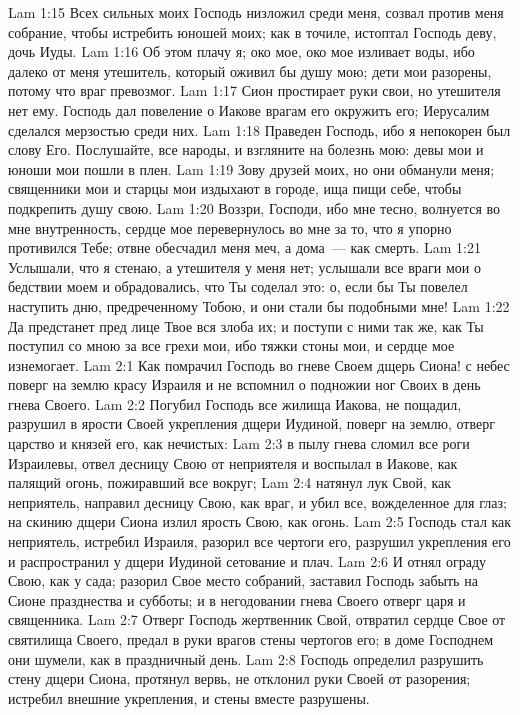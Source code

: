 \vs Lam 1:15 Всех сильных моих Господь низложил среди меня, созвал против меня собрание, чтобы истребить юношей моих; как в точиле, истоптал Господь деву, дочь Иуды.
\vs Lam 1:16 Об этом плачу я; око мое, око мое изливает воды, ибо далеко от меня утешитель, который оживил бы душу мою; дети мои разорены, потому что враг превозмог.
\vs Lam 1:17 Сион простирает руки свои, но утешителя нет ему. Господь дал повеление о Иакове врагам его окружить его; Иерусалим сделался мерзостью среди них.
\vs Lam 1:18 Праведен Господь, ибо я непокорен был слову Его. Послушайте, все народы, и взгляните на болезнь мою: девы мои и юноши мои пошли в плен.
\vs Lam 1:19 Зову друзей моих, но они обманули меня; священники мои и старцы мои издыхают в городе, ища пищи себе, чтобы подкрепить душу свою.
\vs Lam 1:20 Воззри, Господи, ибо мне тесно, волнуется во мне внутренность, сердце мое перевернулось во мне за то, что я упорно противился Тебе; отвне обесчадил меня меч, а дома~--- как смерть.
\vs Lam 1:21 Услышали, что я стенаю, а утешителя у меня нет; услышали все враги мои о бедствии моем и обрадовались, что Ты соделал это: о, если бы Ты повелел наступить дню, предреченному Тобою, и они стали бы подобными мне!
\vs Lam 1:22 Да предстанет пред лице Твое вся злоба их; и поступи с ними так же, как Ты поступил со мною за все грехи мои, ибо тяжки стоны мои, и сердце мое изнемогает.
\vs Lam 2:1 Как помрачил Господь во гневе Своем дщерь Сиона! с небес поверг на землю красу Израиля и не вспомнил о подножии ног Своих в день гнева Своего.
\vs Lam 2:2 Погубил Господь все жилища Иакова, не пощадил, разрушил в ярости Своей укрепления дщери Иудиной, поверг на землю, отверг царство и князей его, как нечистых:
\vs Lam 2:3 в пылу гнева сломил все роги Израилевы, отвел десницу Свою от неприятеля и воспылал в Иакове, как палящий огонь, пожиравший все вокруг;
\vs Lam 2:4 натянул лук Свой, как неприятель, направил десницу Свою, как враг, и убил все, вожделенное для глаз; на скинию дщери Сиона излил ярость Свою, как огонь.
\vs Lam 2:5 Господь стал как неприятель, истребил Израиля, разорил все чертоги его, разрушил укрепления его и распространил у дщери Иудиной сетование и плач.
\vs Lam 2:6 И отнял ограду Свою, как у сада; разорил Свое место собраний, заставил Господь забыть на Сионе празднества и субботы; и в негодовании гнева Своего отверг царя и священника.
\vs Lam 2:7 Отверг Господь жертвенник Свой, отвратил сердце Свое от святилища Своего, предал в руки врагов стены чертогов его; в доме Господнем они шумели, как в праздничный день.
\vs Lam 2:8 Господь определил разрушить стену дщери Сиона, протянул вервь, не отклонил руки Своей от разорения; истребил внешние укрепления, и стены вместе разрушены.
